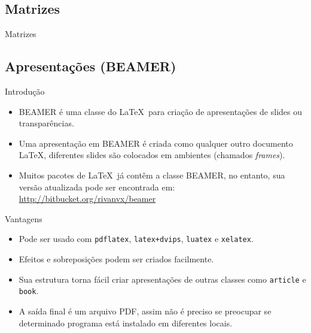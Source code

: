 \subsection{Matrizes}
\begin{frame}{Matrizes}

\end{frame}

\subsection{Apresentações (BEAMER)}

\begin{frame}[fragile]{Introdução}
    \begin{itemize}
    \item {\footnotesize BEAMER} é uma classe do \LaTeX\ para criação de apresentações de slides ou transparências.
    \item Uma apresentação em {\footnotesize BEAMER} é criada como qualquer outro documento \LaTeX, diferentes slides são colocados em ambientes (chamados \textit{frames}).
    \item Muitos pacotes de \LaTeX\ já contêm a classe {\footnotesize BEAMER}, no entanto, sua versão atualizada pode ser encontrada em: \url{http://bitbucket.org/rivanvx/beamer}
    \end{itemize}
\end{frame}

\begin{frame}[fragile]{Vantagens}
    \begin{itemize}
    \item Pode ser usado com \verb|pdflatex|, \verb|latex+dvips|, \verb|luatex| e \verb|xelatex|.
    \item Efeitos e sobreposições podem ser criados facilmente.
    \item Sua estrutura torna fácil criar apresentações de outras classes como \verb|article| e \verb|book|.
    \item A saída final é um arquivo PDF, assim não é preciso se preocupar se determinado programa está instalado em diferentes locais.
    \end{itemize}
\end{frame}

